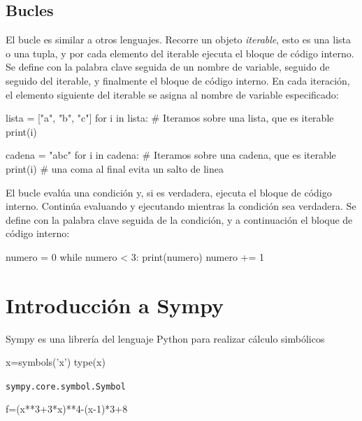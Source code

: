 \subsection{Bucles}
El bucle  es similar a  otros lenguajes. Recorre un objeto \emph{iterable},
esto es  una lista o una tupla, y por cada elemento del iterable 
ejecuta el bloque de código interno. 
Se define con la palabra clave  seguida de un nombre de variable, 
seguido de  seguido del iterable, y finalmente el bloque de código interno. 
En cada iteración, el elemento siguiente del iterable se asigna al nombre de variable 
especificado:

\begin{pyconsole}
lista = ["a", "b", "c"]
for i in lista: # Iteramos sobre una lista, que es iterable
    print(i)

cadena = "abc"
for i in cadena: # Iteramos sobre una cadena, que es iterable
    print(i) # una coma al final evita un salto de linea

\end{pyconsole}

% 
El bucle  evalúa una condición y, si es verdadera, ejecuta el bloque
de código interno. Continúa evaluando y ejecutando mientras la condición sea verdadera.
Se define con la palabra clave  seguida de la condición, y a continuación 
el bloque de código interno:
\begin{pyconsole}
numero = 0
while numero < 3:
    print(numero)
    numero += 1  

\end{pyconsole}


\section{Introducción a Sympy}


Sympy es una librería del lenguaje Python para realizar cálculo simbólicos




\begin{sympyblock} 
x=symbols('x')
type(x)
\end{sympyblock}

\texttt{sympy.core.symbol.Symbol}
 
\begin{sympyblock}
f=(x**3+3*x)**4-(x-1)*3+8
\end{sympyblock}

